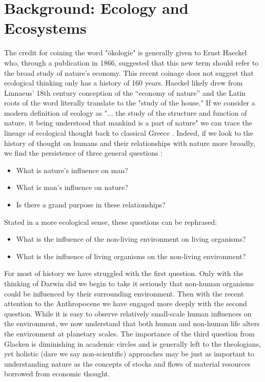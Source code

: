 \section {Background: Ecology and Ecosystems}

The credit for coining the word "ökologie" is generally given to Ernst Haeckel who, through a publication in 1866, suggested that this new term should refer to the broad study of nature's economy. This recent coinage does not suggest that ecological thinking only has a history of 160 years. Haeckel likely drew from Linnaeus’ 18th century conception of the “economy of nature” \cite{worster_1977} and the Latin roots of the word literally translate to the "study of the house." If we consider a modern definition of ecology as "... the study of the structure and function of nature, it being understood that mankind is a part of nature" we can trace the lineage of ecological thought back to classical Greece \cite{odum_1953}. Indeed, if we look to the history of thought on humans and their relationships with nature more broadly, we find the persistence of three general questions \cite{glacken_1967}: \begin{itemize} \item What is nature's influence on man? \item What is man's influence on nature? \item Is there a grand purpose in these relationships? \end{itemize} Stated in a more ecological sense, these questions can be rephrased: \begin{itemize} \item What is the influence of the non-living environment on living organisms? \item What is the influence of living organisms on the non-living environment? \end{itemize} For most of history we have struggled with the first question. Only with the thinking of Darwin did we begin to take it seriously that non-human organisms could be influenced by their surrounding environment. Then with the recent attention to the Anthropocene we have engaged more deeply with the second question. While it is easy to observe relatively small-scale human influences on the environment, we now understand that both human and non-human life alters the environment at planetary scales. The importance of the third question from Glacken is diminishing in academic circles and is generally left to the theologians, yet holistic (dare we say non-scientific) approaches may be just as important to understanding nature as the concepts of stocks and flows of material resources borrowed from economic thought. 

